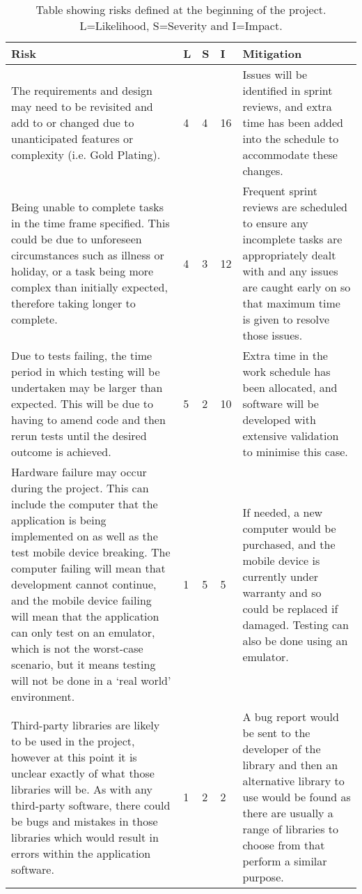\begin{table}[H]
\centering
\caption{Table showing risks defined at the beginning of the project. L=Likelihood, S=Severity and I=Impact.}
    \begin{tabular}{|p{5cm}|p{0.5cm}|p{0.5cm}|p{0.5cm}|p{5cm}|}
        \hline
        Risk& L& S& I& Mitigation\\
        \hline
        The requirements and design may need to be revisited and add to or changed due to unanticipated features or complexity (i.e. Gold Plating).& 4& 4& 16& Issues will be identified in sprint reviews, and extra time has been added into the schedule to accommodate these changes.\\
        \hline
        Being unable to complete tasks in the time frame specified. This could be due to unforeseen circumstances such as illness or holiday, or a task being more complex than initially expected, therefore taking longer to complete.& 4& 3& 12& Frequent sprint reviews are scheduled to ensure any incomplete tasks are appropriately dealt with and any issues are caught early on so that maximum time is given to resolve those issues.\\
        \hline
        Due to tests failing, the time period in which testing will be undertaken may be larger than expected. This will be due to having to amend code and then rerun tests until the desired outcome is achieved.& 5& 2& 10& Extra time in the work schedule has been allocated, and software will be developed with extensive validation to minimise this case.\\
        \hline
        Hardware failure may occur during the project. This can include the computer that the application is being implemented on as well as the test mobile device breaking. The computer failing will mean that development cannot continue, and the mobile device failing will mean that the application can only test on an emulator, which is not the worst-case scenario, but it means testing will not be done in a ‘real world’ environment.& 1& 5& 5& If needed, a new computer would be purchased, and the mobile device is currently under warranty and so could be replaced if damaged. Testing can also be done using an emulator.\\
        \hline
        Third-party libraries are likely to be used in the project, however at this point it is unclear exactly of what those libraries will be. As with any third-party software, there could be bugs and mistakes in those libraries which would result in errors within the application software.& 1& 2& 2&  A bug report would be sent to the developer of the library and then an alternative library to use would be found as there are usually a range of libraries to choose from that perform a similar purpose.\\
        \hline
    \end{tabular}
\end{table}